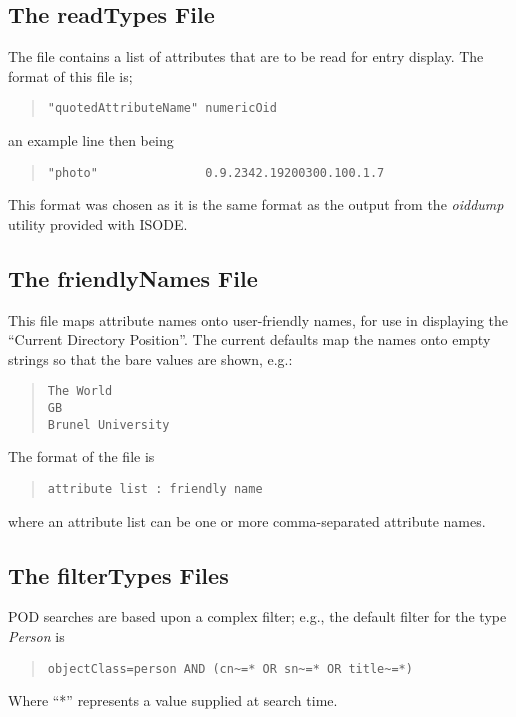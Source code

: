 \subsection {The readTypes File}

The file  contains a list of attributes that are to be read for
entry display.
The format of this file is;
\begin{quote}\small\begin{verbatim}
"quotedAttributeName" numericOid
\end{verbatim}\end{quote}
an example line then being
\begin{quote}\small\begin{verbatim}
"photo"               0.9.2342.19200300.100.1.7
\end{verbatim}\end{quote}

This format was chosen as it is the same format as the output from the
{\em oiddump}
utility provided with ISODE.

\subsection {The friendlyNames File}

This file maps attribute names onto user-friendly names,
for use in displaying the ``Current Directory Position''.
The current defaults map the names onto empty strings so that the
bare values are shown,
e.g.:

\begin{quote}\begin{verbatim}
The World
GB
Brunel University
\end{verbatim}\end{quote}

The format of the file is

\begin{quote}\begin{verbatim}
attribute list : friendly name
\end{verbatim}\end{quote}
where an attribute list can be one or more comma-separated attribute names.

\subsection {The filterTypes Files}
	
POD searches are based upon a complex filter;
e.g., the default filter for the type {\em Person} is
\begin{quote}\begin{verbatim}
objectClass=person AND (cn~=* OR sn~=* OR title~=*)
\end{verbatim}\end{quote}
Where ``*'' represents a value supplied at search
time.

